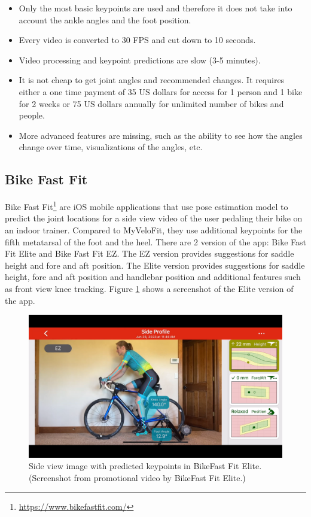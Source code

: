 \begin{itemize}
    \item Only the most basic keypoints are used and therefore it does not take into account the ankle angles and the foot position.
    \item Every video is converted to 30 FPS and cut down to 10 seconds.
    \item Video processing and keypoint predictions are slow (3-5 minutes).
    \item It is not cheap to get joint angles and recommended changes. It requires either a one time payment of 35 US dollars for access for 1 person and 1 bike for 2 weeks or 75 US dollars annually for unlimited number of bikes and people.
    \item More advanced features are missing, such as the ability to see how the angles change over time, visualizations of the angles, etc.
\end{itemize}





\subsection{Bike Fast Fit }
Bike Fast Fit\footnote{\url{https://www.bikefastfit.com/}} are iOS mobile applications that use pose estimation model to predict the joint locations for a side view video of the user pedaling their bike on an indoor trainer. Compared to MyVeloFit, they use additional keypoints for the fifth metatarsal of the foot and the heel. There are 2 version of the app: Bike Fast Fit Elite and Bike Fast Fit EZ. The EZ version provides suggestions for saddle height and fore and aft position. The Elite version provides suggestions for saddle height, fore and aft position and handlebar position and additional features such as front view knee tracking. Figure \ref{fig:bikefastfit_keypoints} shows a screenshot of the Elite version of the app.

\begin{figure}[htb]
    \centering
    \includegraphics[width=\textwidth]{obrazky-figures/bike_fast_fit_elite.png}
    \caption{Side view image with predicted keypoints in BikeFast Fit Elite. (Screenshot from promotional video \cite{bikeFastFitElitev2Youtube} by BikeFast Fit Elite.)}
    \label{fig:bikefastfit_keypoints}
\end{figure}

